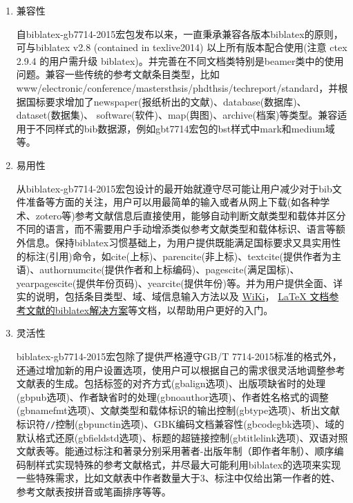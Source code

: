 \documentclass[twoside,11pt]{article} %
\begin{document}
\begin{enumerate}
  \item 兼容性

自biblatex-gb7714-2015宏包发布以来，一直秉承兼容各版本biblatex的原则，可与biblatex v2.8 (contained in texlive2014) 以上所有版本配合使用(注意 ctex 2.9.4 的用户需升级 biblatex)。并完善在不同文档类特别是beamer类中的使用问题。兼容一些传统的参考文献条目类型，比如www/electronic/conference/mastersthsis/phdthsis/techreport/standard，并根据国标要求增加了newspaper(报纸析出的文献)、database(数据库)、dataset(数据集)、 software(软件)、map(舆图)、archive(档案)等类型。兼容适用于不同样式的bib数据源，例如gbt7714宏包的bst样式中mark和medium域等。

  \item 易用性

从biblatex-gb7714-2015宏包设计的最开始就遵守尽可能让用户减少对于bib文件准备等方面的关注，用户可以用最简单的输入或者从网上下载(如各种学术、zotero等)参考文献信息后直接使用，能够自动判断文献类型和载体并区分不同的语言，而不需要用户手动增添类似参考文献类型和载体标识、语言等额外信息。保持biblatex习惯基础上，为用户提供既能满足国标要求又具实用性的标注(引用)命令，如cite(上标)、parencite(非上标)、textcite(提供作者为主语)、authornumcite(提供作者和上标编码)、pagescite(满足国标)、yearpagescite(提供年份页码)、yearcite(提供年份)等。并为用户提供全面、详实的说明，包括条目类型、域、域信息输入方法以及
\href{https://github.com/hushidong/biblatex-gb7714-2015/wiki}{WiKi}，
\href{https://github.com/hushidong/biblatex-solution-to-latex-bibliography/blob/master/biblatex-solution-to-latex-bibliography.pdf}{LaTeX 文档参考文献的biblatex解决方案}等文档，以帮助用户更好的入门。

  \item 灵活性

biblatex-gb7714-2015宏包除了提供严格遵守GB/T 7714-2015标准的格式外，还通过增加新的用户设置选项，使用户可以根据自己的需求很灵活地调整参考文献表的生成。包括标签的对齐方式(gbalign选项)、出版项缺省时的处理(gbpub选项)、作者缺省时的处理(gbnoauthor选项)、作者姓名格式的调整(gbnamefmt选项)、文献类型和载体标识的输出控制(gbtype选项)、析出文献标识符\texttt{//}控制(gbpunctin选项)、GBK编码文档兼容性(gbcodegbk选项)、域的默认格式还原(gbfieldstd选项)、标题的超链接控制(gbtitlelink选项)、双语对照文献表等。能通过标注和著录分别采用著者-出版年制（即作者年制）、顺序编码制样式实现特殊的参考文献格式，并尽最大可能利用biblatex的选项来实现一些特殊需求，比如文献表中作者数量大于3、标注中仅给出第一作者的姓、参考文献表按拼音或笔画排序等等。
\end{enumerate}
\end{document}
